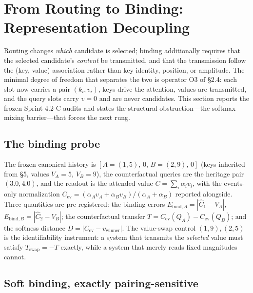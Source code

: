 \section{From Routing to Binding: Representation Decoupling}
\label{sec:binding}

Routing changes \emph{which} candidate is selected; binding additionally
requires that the selected candidate's \emph{content} be transmitted, and
that the transmission follow the (key, value) association rather than key
identity, position, or amplitude. The minimal degree of freedom that
separates the two is operator O3 of §2.4: each slot now carries a pair
$(k_i,v_i)$, keys drive the attention, values are transmitted, and the
query slots carry $v=0$ and are never candidates. This section reports the
frozen Sprint 4.2-C audits and states the structural obstruction---the
softmax mixing barrier---that forces the next rung.

\subsection{The binding probe}
\label{sec:probe6}

The frozen canonical history is $[A=(1,5),\,0,\,B=(2,9),\,0]$ (keys
inherited from §5, values $V_A=5$, $V_B=9$), the counterfactual queries are
the heritage pair $(3.0,4.0)$, and the readout is the attended value
$C=\sum_i\alpha_i v_i$, with the events-only normalization
$C_{\mathrm{ev}}=(\alpha_Av_A+\alpha_Bv_B)/(\alpha_A+\alpha_B)$ reported
alongside. Three quantities are pre-registered: the binding errors
$E_{\mathrm{bind},A}=|\hat C_1-V_A|$, $E_{\mathrm{bind},B}=|\hat
C_2-V_B|$; the counterfactual transfer
$T=C_{\mathrm{ev}}(Q_A)-C_{\mathrm{ev}}(Q_B)$; and the softness distance
$D=|C_{\mathrm{ev}}-v_{\mathrm{winner}}|$. The value-swap control
$(1,9),(2,5)$ is the identifiability instrument: a system that transmits
the \emph{selected} value must satisfy $T_{\mathrm{swap}}=-T$ exactly,
while a system that merely reads fixed magnitudes cannot.

\subsection{Soft binding, exactly pairing-sensitive}
\label{sec:softresults}

